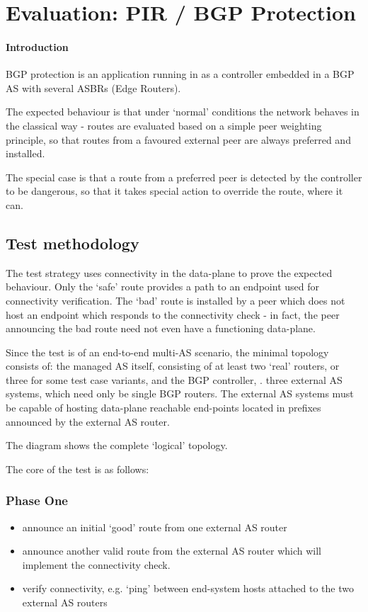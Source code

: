 
\section{Evaluation: PIR / BGP Protection}
\paragraph{Introduction}

BGP protection is an application running in \hbgp as a controller embedded in a BGP AS with several ASBRs (Edge Routers).

The expected behaviour is that under `normal' conditions the network behaves in the classical way - routes are evaluated based on a simple peer weighting principle, so that routes from a favoured external peer are always preferred and installed.

The special case is that a route from a preferred peer is detected by the \hbgp controller to be dangerous, so that it takes special action to override the route, where it can.

\subsection{Test methodology}

The test strategy uses connectivity in the data-plane to prove the expected behaviour. 
 Only the `safe' route provides a path to an endpoint used for connectivity verification.
  The `bad' route is installed by a peer which does not host an endpoint which responds to the connectivity check - in fact, the peer announcing the bad route need not even have a functioning data-plane.

Since the test is of an end-to-end multi-AS scenario, the minimal topology consists of:
the managed AS itself, consisting of at least two `real' routers, or three for some test case variants,
and the BGP controller, \hbgp.
three external AS systems, which need only be single BGP routers.  The external AS systems must be capable of hosting data-plane reachable end-points located in prefixes announced by the external AS router.

The diagram shows the complete `logical' topology.


The core of the test is as follows:

\subsubsection{Phase One}
\begin{itemize}
    \item announce an initial `good' route from one external AS router
    \item announce another valid route from the external AS router which will implement the connectivity check.
    \item verify connectivity, e.g. `ping' between end-system hosts attached to the two external AS routers
\end{itemize}

